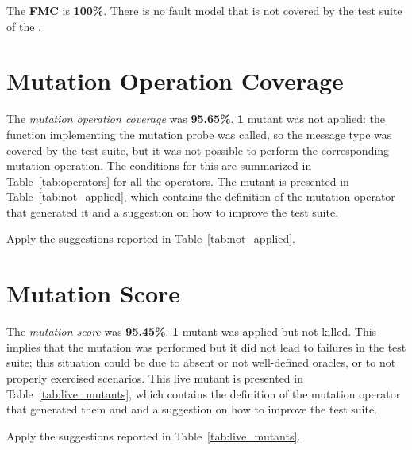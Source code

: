 The \textbf{FMC} is \textbf{100\%}. There is no fault model that is not covered by the test suite of the \case.

\section{Mutation Operation Coverage}

The \emph{mutation operation coverage} was \textbf{95.65\%}. \textbf{1} mutant was not applied: the function implementing the mutation probe was called, so the message type was covered by the test suite, but it was not possible to perform the corresponding mutation operation.
The conditions for this are summarized in Table~\ref{tab:operators} for all the operators.
The mutant is presented in Table~\ref{tab:not_applied}, which contains the definition of the mutation operator that generated it and a suggestion on how to improve the test suite.

\action Apply the suggestions reported in Table~\ref{tab:not_applied}.

 


\section{Mutation Score}

 The \emph{mutation score} was \textbf{95.45\%}. \textbf{1} mutant was applied but not killed. This implies that the mutation was performed but it did not lead to failures in the test suite; this situation could be due to absent or not well-defined oracles, or to not properly exercised scenarios.
 This live mutant is presented in Table~\ref{tab:live_mutants}, which contains the definition of the mutation operator that generated them and and a suggestion on how to improve the test suite.

\action Apply the suggestions reported in Table~\ref{tab:live_mutants}.


